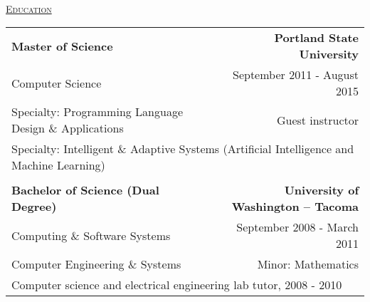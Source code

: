 \documentclass[letterpaper]{article}
\begin{document}
\begin{center}
\begin{tabular}{p{}p{}r}
		\end{tabular} \\
		\vspace{0.25in} %
		\underline{\large \scshape Education}
		\begin{tabular}{p{}r}
				\textbf{Master of Science}							&
				\textbf{Portland State University \quad}
			\\
				\quad Computer Science\quad				&
				{September 2011 - August 2015 \quad\quad}
			\\
				\quad Specialty: Programming Language Design \& Applications		&		{Guest instructor \quad\quad}
			\\	
				\multicolumn{2}{p{\textwidth}}{\quad Specialty: Intelligent \& Adaptive Systems (Artificial Intelligence and Machine Learning)}
				
			\\
			\\
				\textbf{Bachelor of Science (Dual Degree)}			&
				\textbf{University of Washington -- Tacoma \quad}
			\\
				{\quad Computing \& Software Systems}						&
				{September 2008 - March 2011 \quad\quad}
			\\
				{\quad Computer Engineering \& Systems}						&
				{Minor: Mathematics \quad\quad}
			\\
				\multicolumn{2}{p{\textwidth}}{\quad Computer science and electrical engineering lab tutor, 2008 - 2010}	
				

\end{tabular}
\end{center}
\end{document}
